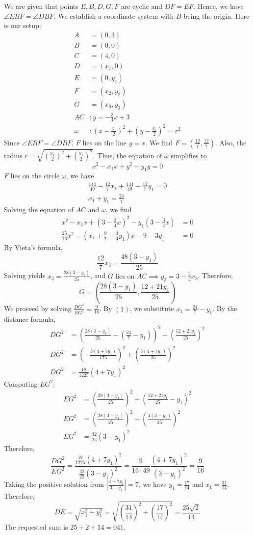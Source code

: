 \begin{enumerate}
We are given that points $E,B,D,G,F$ are cyclic and $DF=EF$. Hence, we have $\angle EBF=\angle DBF$. We establish a coordinate system with $B$ being the origin. Here is our setup:\begin{align*}A&=(0,3)\\B&=(0,0)\\C&=(4,0)\\D&=(x_1,0)\\E&=(0,y_1)\\F&=(x_2,y_2)\\G&=(x_3,y_3)\\AC&:y=-\frac{3}{4}x+3\\\omega&: \left(x-\frac{x_{1}}{2}\right)^2+\left(y-\frac{y_{1}}{2}\right)^2=r^2\end{align*}
Since $\angle EBF=\angle DBF$, $F$ lies on the line $y=x$. We find $F=\left(\frac{12}{7},\frac{12}{7}\right)$. Also, the radius $r=\sqrt{\left(\frac{x_1}{2}\right)^2+\left(\frac{y_1}{2}\right)^2}$. Thus, the equation of $\omega$ simplifies to
 \[x^2-x_1x+y^2-y_1y=0\]$F$ lies on the circle $\omega$, we have\begin{gather*}\frac{144}{49}-\frac{12}{7}x_{1}+\frac{144}{49}-\frac{12}{7}y_{1}=0\\x_{1}+y_{1}=\frac{24}{7}\tag{1}\end{gather*}Solving the equation of $AC$ and $\omega$, we find\begin{align*}x^2-x_1x+(3-\frac{3}{4}x)^2-y_1(3-\frac{3}{4}x)&=0\\\frac{25}{16}x^2-(x_1+\frac{9}{2}-\frac{3}{4}y_{1})x+9-3y_{1}&=0\end{align*}
By Vieta's formula,
 \[\frac{12}{7}x_{3}=\frac{48(3-y_1)}{25}\]Solving yields $x_{3}=\frac{28(3-y_1)}{25}$, and $G \text{ lies on }AC\implies y_{3}=3-\frac{3}{4}x_3$. Therefore,
 \[G=\left(\frac{28(3-y_1)}{25}, \frac{12+21y_{1}}{25}\right)\]We proceed by solving $\frac{DG^2}{EG^2}=\frac{9}{16}$. By $(1)$, we substitute $x_{1}=\frac{24}{7}-y_1$. By the distance formula,\begin{align*}DG^2&=\left(\frac{28(3-y_1)}{25}-(\frac{24}{7}-y_1)\right)^2+\left(\frac{12+21y_{1}}{25}\right)^2\\DG^2&=\left(-\frac{3(4+7y_{1})}{175}\right)^2+\left(\frac{3(4+7y_{1})}{25}\right)^2\\DG^2&=\frac{18}{1225}(4+7y_{1})^2\end{align*}
Computing $EG^2$:\begin{align*}EG^2&=\left(\frac{28(3-y_1)}{25}\right)^2+\left(\frac{12+21y_{1}}{25}-y_1\right)^2\\EG^2&=\left(\frac{28(3-y_1)}{25}\right)^2+\left(\frac{4(3-y_{1})}{25}\right)^2\\EG^2&=\frac{32}{25}(3-y_{1})^2\end{align*}
Therefore,
 \[\frac{DG^2}{EG^2}=\frac{\frac{18}{1225}(4+7y_{1})^2}{\frac{32}{25}(3-y_{1})^2}=\frac{9}{16\cdot 49}\frac{(4+7y_{1})^2}{(3-y_{1})^2}=\frac{9}{16}\]Taking the positive solution from $\left\lvert\frac{4+7y_{1}}{3-y_{1}}\right\rvert=7$, we have $y_{1}=\frac{17}{14}$ and $x_{1}=\frac{31}{14}$. Therefore,
 \[DE=\sqrt{x_1^2+y_1^2}=\sqrt{\left(\frac{31}{14}\right)^2+\left(\frac{17}{14}\right)^2}=\frac{25\sqrt{2}}{14}\]The requested sum is $25+2+14=\boxed{041}$.

 


\end{enumerate}